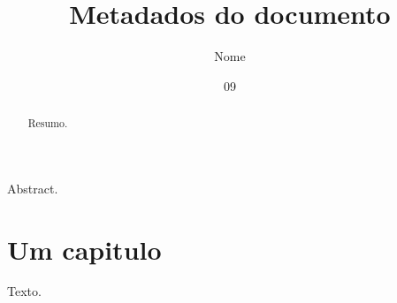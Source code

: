 \documentclass[dsc,pdfa]{ufrj}
\title{Metadados do documento}
\author{Nome}{Sobrenome}
\date{09}{2026}
\begin{document}
  \maketitle
  \frontmatter
  \begin{abstract}Resumo.\end{abstract}
  \begin{foreignabstract}Abstract.\end{foreignabstract}
  \tableofcontents
  \mainmatter
  \chapter{Um capitulo}
  Texto.
\end{document}
